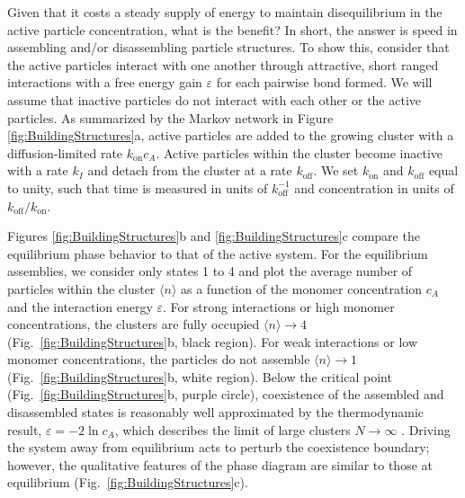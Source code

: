 \begin{appendices}
Given that it costs a steady supply of energy to maintain disequilibrium in the active particle concentration, what is the benefit? In short, the answer is speed in assembling and/or disassembling particle structures. To show this, consider that the active particles interact with one another through attractive, short ranged interactions with a free energy gain $\varepsilon$ for each pairwise bond formed. We will assume that inactive particles do not interact with each other or the active particles. As summarized by the Markov network in Figure \ref{fig:BuildingStructures}a, active particles are added to the growing cluster with a diffusion-limited rate $k_{\text{on}} c_A$.  Active particles within the cluster become inactive with a rate $k_I$ and detach from the cluster at a rate $k_{\text{off}}$.  We set $k_{\text{on}}$ and $k_{\text{off}}$ equal to unity, such that time is measured in units of $k^{-1}_{\text{off}}$ and concentration in units of $k_{\text{off}}/k_{\text{on}}$.

Figures \ref{fig:BuildingStructures}b and \ref{fig:BuildingStructures}c compare the equilibrium phase behavior to that of the active system.  For the equilibrium assemblies, we consider only states 1 to 4 and plot the average number of particles within the cluster $\langle n\rangle$ as a function of the monomer concentration $c_A$ and the interaction energy $\varepsilon$.  For strong interactions or high monomer concentrations, the clusters are fully occupied $\langle n\rangle\rightarrow 4$ (Fig.~\ref{fig:BuildingStructures}b, black region).  For weak interactions or low monomer concentrations, the particles do not assemble $\langle n\rangle \rightarrow 1$ (Fig.~\ref{fig:BuildingStructures}b, white region).  Below the critical point (Fig.~\ref{fig:BuildingStructures}b, purple circle), coexistence of the assembled and disassembled states is reasonably well approximated by the thermodynamic result, $\varepsilon = -2\ln c_A$, which describes the limit of large clusters $N\rightarrow\infty$ \cite{marsland2018active}.  Driving the system away from equilibrium acts to perturb the coexistence boundary; however, the qualitative features of the phase diagram are similar to those at equilibrium (Fig.~\ref{fig:BuildingStructures}c). 


\end{appendices}
